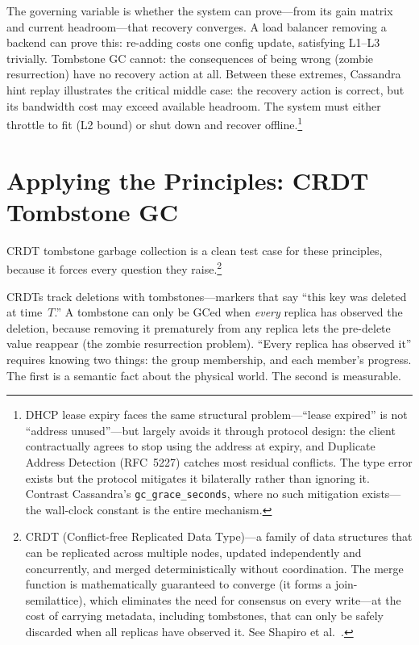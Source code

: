 \documentclass[11pt]{article}
\begin{document}
The governing variable is whether the system can prove---from its gain matrix
and current headroom---that recovery converges. A load balancer removing a
backend can prove this: re-adding costs one config update, satisfying L1--L3
trivially. Tombstone GC cannot: the consequences of being wrong (zombie
resurrection) have no recovery action at all. Between these extremes, Cassandra
hint replay illustrates the critical middle case: the recovery action is correct,
but its bandwidth cost may exceed available headroom. The system must either
throttle to fit (L2 bound) or shut down and recover
offline.\footnote{DHCP lease expiry faces the same structural
problem---``lease expired'' is not ``address unused''---but largely avoids it
through protocol design: the client contractually agrees to stop using the
address at expiry, and Duplicate Address Detection (RFC~5227) catches most
residual conflicts. The type error exists but the protocol mitigates it
bilaterally rather than ignoring it. Contrast Cassandra's
\texttt{gc\_grace\_seconds}, where no such mitigation exists---the wall-clock
constant is the entire mechanism.}

\section{Applying the Principles: CRDT Tombstone GC}

CRDT tombstone garbage collection is a clean test case for these principles,
because it forces every question they raise.\footnote{CRDT (Conflict-free
Replicated Data Type)---a family of data structures that can be replicated across
multiple nodes, updated independently and concurrently, and merged
deterministically without coordination. The merge function is mathematically
guaranteed to converge (it forms a join-semilattice), which eliminates the need
for consensus on every write---at the cost of carrying metadata, including
tombstones, that can only be safely discarded when all replicas have observed it.
See Shapiro et al.~\cite{shapiro2011comprehensive}.}

CRDTs track deletions with tombstones---markers that say ``this key was deleted
at time~$T$.'' A tombstone can only be GCed when \emph{every} replica has
observed the deletion, because removing it prematurely from any replica lets the
pre-delete value reappear (the zombie resurrection problem). ``Every replica has
observed it'' requires knowing two things: the group membership, and each
member's progress. The first is a semantic fact about the physical world. The
second is measurable.
\end{document}
